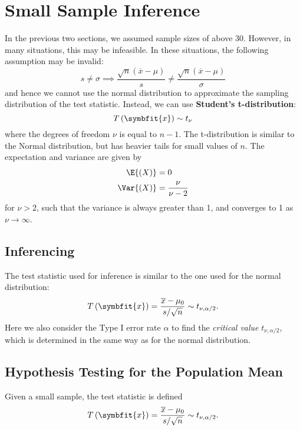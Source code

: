 \documentclass{article}
\begin{document}
\section{Small Sample Inference}
In the previous two sections, we assumed sample sizes of above 30.
However, in many situations, this may be infeasible.
In these situations, the following assumption may be invalid:
\begin{equation*}
    s \neq \sigma \implies \frac{\sqrt{n}\left( \overline{x} - \mu \right)}{s} \neq \frac{\sqrt{n}\left( \overline{x} - \mu \right)}{\sigma}
\end{equation*}
and hence we cannot use the normal distribution to approximate the sampling distribution of the test statistic.
Instead, we can use \textbf{Student's t-distribution}:
\begin{equation*}
    T\left( \symbfit{x} \right) \sim t_{\nu}
\end{equation*}
where the degrees of freedom \(\nu\) is equal to \(n - 1\). The t-distribution is similar to the Normal distribution,
but has heavier tails for small values of \(n\). The expectation and variance are given by
\begin{align*}
    \E{\left( X \right)}   & = 0                   \\
    \Var{\left( X \right)} & = \frac{\nu}{\nu - 2} \\
\end{align*}
for \(\nu > 2\), such that the variance is always greater than 1, and
converges to 1 as \(\nu \rightarrow \infty\).
\subsection{Inferencing}
The test statistic used for inference is similar to the one used for the normal distribution:
\begin{equation*}
    T\left( \symbfit{x} \right) = \frac{\overline{x} - \mu_0}{s / \sqrt{n}} \sim t_{\nu, \alpha/2}.
\end{equation*}
Here we also consider the Type I error rate \(\alpha\) to find the \textit{critical value} \(t_{\nu,\alpha/2}\), which is determined
in the same way as for the normal distribution.
\subsection{Hypothesis Testing for the Population Mean}
Given a small sample, the test statistic is defined
\begin{equation*}
    T\left( \symbfit{x} \right) = \frac{\overline{x} - \mu_0}{s/\sqrt{n}} \sim t_{\nu, \alpha/2}.
\end{equation*}
\end{document}
